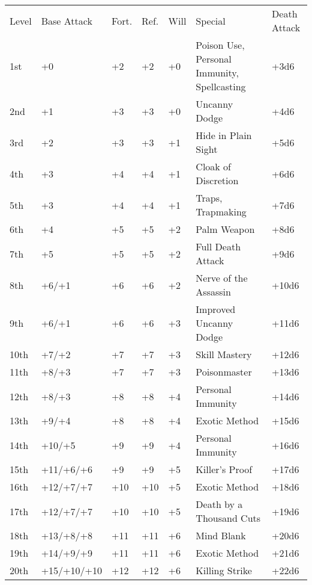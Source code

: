 \begin{table}[htb]
\centering
\begin{small}
\begin{tabular}{p{.275in}p{.75in}p{0.275in}p{0.275in}p{0.275in}L{3.075in}C{0.575in}}
 Level &Base Attack &Fort. &Ref. &Will &Special& Death Attack\\
1st &+0 &+2 &+2 &+0 &Poison Use, Personal Immunity, Spellcasting&+3d6\\
2nd &+1 &+3 &+3 &+0 &Uncanny Dodge& +4d6\\
3rd &+2 &+3 &+3 &+1 &Hide in Plain Sight& +5d6\\
4th &+3 &+4 &+4 &+1 &Cloak of Discretion& +6d6\\
5th &+3 &+4 &+4 &+1 &Traps, Trapmaking& +7d6\\
6th &+4 &+5 &+5 &+2 &Palm Weapon& +8d6\\
7th &+5 &+5 &+5 &+2 &Full Death Attack& +9d6\\
8th &+6/+1 &+6 &+6 &+2 &Nerve of the Assassin& +10d6\\
9th &+6/+1 &+6 &+6 &+3 &Improved Uncanny Dodge& +11d6\\
10th &+7/+2 &+7 &+7 &+3 &Skill Mastery& +12d6\\
11th &+8/+3 &+7 &+7 &+3 &Poisonmaster& +13d6\\
12th &+8/+3 &+8 &+8 &+4 &Personal Immunity& +14d6\\
13th &+9/+4 &+8 &+8 &+4 &Exotic Method& +15d6\\
14th &+10/+5 &+9 &+9 &+4 &Personal Immunity& +16d6\\
15th &+11/+6/+6 &+9 &+9 &+5 &Killer's Proof& +17d6\\
16th &+12/+7/+7 &+10 &+10 &+5 &Exotic Method& +18d6\\
17th &+12/+7/+7 &+10 &+10 &+5 &Death by a Thousand Cuts& +19d6\\
18th &+13/+8/+8 &+11 &+11 &+6 &Mind Blank& +20d6\\
19th &+14/+9/+9 &+11 &+11 &+6 &Exotic Method& +21d6\\
20th &+15/+10/+10 &+12 &+12 &+6 &Killing Strike& +22d6\\
\end{tabular}
\end{small}
\end{table}


